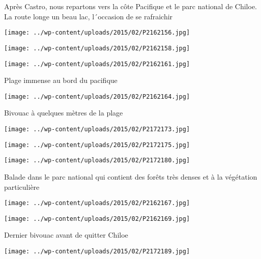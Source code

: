  \newline
 Après Castro, nous repartons vers la côte Pacifique et le parc national de Chiloe. \newline
 La route longe un beau lac, l´occasion de se rafraichir \newline
 \newline
\centerline{\texttt{[image: ../wp-content/uploads/2015/02/P2162156.jpg]} } 
 \newline
 \newline
\centerline{\texttt{[image: ../wp-content/uploads/2015/02/P2162158.jpg]} } 
 \newline
 \newline
\centerline{\texttt{[image: ../wp-content/uploads/2015/02/P2162161.jpg]} } 
 \newline
 Plage immense au bord du pacifique \newline
 \newline
\centerline{\texttt{[image: ../wp-content/uploads/2015/02/P2162164.jpg]} } 
 \newline
 Bivouac à quelques mètres de la plage \newline
 \newline
\centerline{\texttt{[image: ../wp-content/uploads/2015/02/P2172173.jpg]} } 
 \newline
 \newline
\centerline{\texttt{[image: ../wp-content/uploads/2015/02/P2172175.jpg]} } 
 \newline
 \newline
\centerline{\texttt{[image: ../wp-content/uploads/2015/02/P2172180.jpg]} } 
 \newline
 Balade dans le parc national qui contient des forêts très denses et à la végétation particulière \newline
 \newline
\centerline{\texttt{[image: ../wp-content/uploads/2015/02/P2162167.jpg]} } 
 \newline
 \newline
\centerline{\texttt{[image: ../wp-content/uploads/2015/02/P2162169.jpg]} } 
 \newline
 Dernier bivouac avant de quitter Chiloe \newline
 \newline
\centerline{\texttt{[image: ../wp-content/uploads/2015/02/P2172189.jpg]} } 
 \newline
